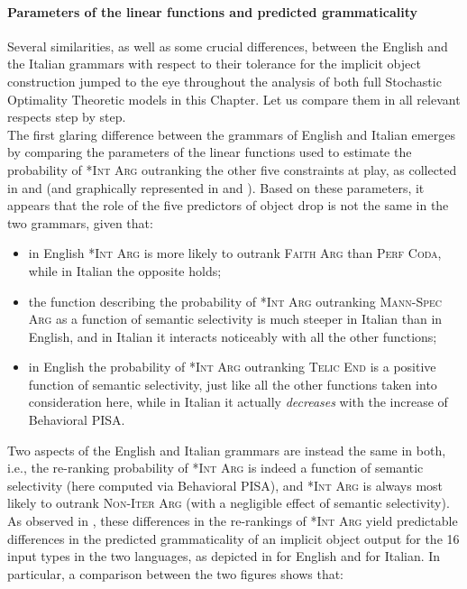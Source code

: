 \paragraph{Parameters of the linear functions and predicted grammaticality}
Several similarities, as well as some crucial differences, between the English and the Italian grammars with respect to their tolerance for the implicit object construction jumped to the eye throughout the analysis of both full Stochastic Optimality Theoretic models in this Chapter. Let us compare them in all relevant respects step by step.\\
The first glaring difference between the grammars of English and Italian emerges by comparing the parameters of the linear functions used to estimate the probability of \textsc{*Int Arg} outranking the other five constraints at play, as collected in  and  (and graphically represented in  and ). Based on these parameters, it appears that the role of the five predictors of object drop is not the same in the two grammars, given that:
\begin{itemize}
    \item in English \textsc{*Int Arg} is more likely to outrank \textsc{Faith Arg} than \textsc{Perf Coda}, while in Italian the opposite holds;
    \item the function describing the probability of \textsc{*Int Arg} outranking \textsc{Mann-Spec Arg} as a function of semantic selectivity is much steeper in Italian than in English, and in Italian it interacts noticeably with all the other functions;
    \item in English the probability of \textsc{*Int Arg} outranking \textsc{Telic End} is a positive function of semantic selectivity, just like all the other functions taken into consideration here, while in Italian it actually \textit{decreases} with the increase of Behavioral PISA.
\end{itemize}
Two aspects of the English and Italian grammars are instead the same in both, i.e., the re-ranking probability of \textsc{*Int Arg} is indeed a function of semantic selectivity (here computed via Behavioral PISA), and \textsc{*Int Arg} is always most likely to outrank \textsc{Non-Iter Arg} (with a negligible effect of semantic selectivity).\\
As observed in , these differences in the re-rankings of \textsc{*Int Arg} yield predictable differences in the predicted grammaticality of an implicit object output for the 16 input types in the two languages, as depicted in  for English and  for Italian. In particular, a comparison between the two figures shows that:

